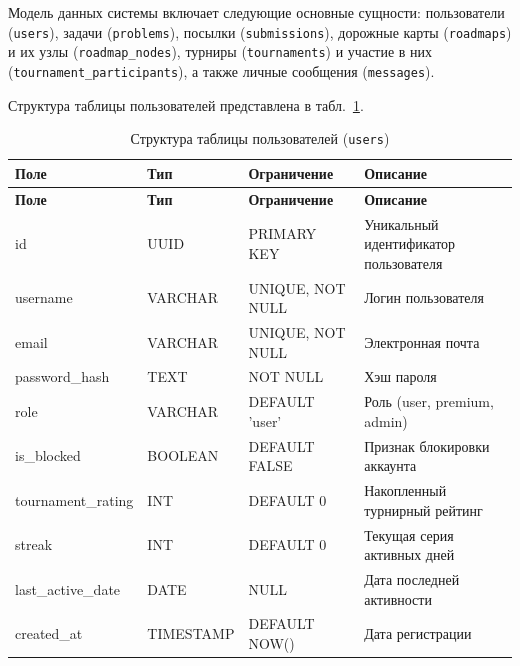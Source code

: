 Модель данных системы включает следующие основные сущности: пользователи
(\texttt{users}), задачи (\texttt{problems}), посылки (\texttt{submissions}),
дорожные карты (\texttt{roadmaps}) и их узлы (\texttt{roadmap\_nodes}),
турниры (\texttt{tournaments}) и участие в них (\texttt{tournament\_participants}),
а также личные сообщения (\texttt{messages}).

Структура таблицы пользователей представлена в табл.~\ref{tab:db_users}.

\begin{longtable}{|l|l|p{3.5cm}|p{5.5cm}|}
	\caption{Структура таблицы пользователей (\texttt{users})} \label{tab:db_users} \\

	\hline
	\textbf{Поле}      & \textbf{Тип} & \textbf{Ограничение} & \textbf{Описание}                        \\ \hline
	\endfirsthead

	\tabcont{\ref{tab:db_users}}
	\textbf{Поле}      & \textbf{Тип} & \textbf{Ограничение} & \textbf{Описание}                        \\ \hline
	\endhead

	\hline
	\endfoot

	\hline
	\endlastfoot

	id                 & UUID         & PRIMARY KEY          & Уникальный идентификатор пользователя    \\ \hline
	username           & VARCHAR      & UNIQUE, NOT NULL     & Логин пользователя                       \\ \hline
	email              & VARCHAR      & UNIQUE, NOT NULL     & Электронная почта                        \\ \hline
	password\_hash     & TEXT         & NOT NULL             & Хэш пароля                               \\ \hline
	role               & VARCHAR      & DEFAULT 'user'       & Роль (user, premium, admin)              \\ \hline
	is\_blocked        & BOOLEAN      & DEFAULT FALSE        & Признак блокировки аккаунта              \\ \hline
	tournament\_rating & INT          & DEFAULT 0            & Накопленный турнирный рейтинг            \\ \hline
	streak             & INT          & DEFAULT 0            & Текущая серия активных дней              \\ \hline
	last\_active\_date & DATE         & NULL                 & Дата последней активности                \\ \hline
	created\_at        & TIMESTAMP    & DEFAULT NOW()        & Дата регистрации                         \\ \hline
\end{longtable}

